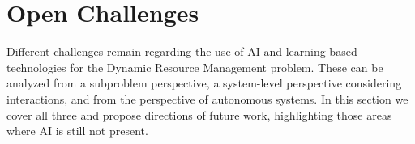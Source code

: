 \documentclass[letterpaper]{article} %
\begin{document}







\section{Open Challenges}


Different challenges remain regarding the use of AI and learning-based technologies for the Dynamic Resource Management problem. These can be analyzed from a subproblem perspective, a system-level perspective considering interactions, and from the perspective of autonomous systems. In this section we cover all three and propose directions of future work, highlighting those areas where AI is still not present.

\end{document}
